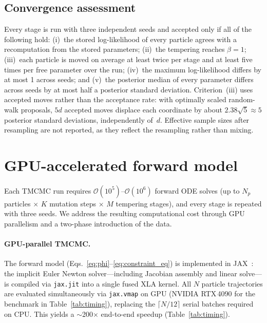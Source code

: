 \documentclass[pdflatex,sn-mathphys-num,lineno]{sn-jnl}
\begin{document}
\subsection{Convergence assessment}
\label{sec:convergence}

Every stage is run with three independent seeds and accepted only if all of the following hold:
(i)~the stored log-likelihood of every particle agrees with a recomputation from the stored parameters;
(ii)~the tempering reaches $\beta=1$;
(iii)~each particle is moved on average at least twice per stage and at least five times per free parameter over the run;
(iv)~the maximum log-likelihood differs by at most 1 across seeds; and
(v)~the posterior median of every parameter differs across seeds by at most half a posterior standard deviation.
Criterion~(iii) uses accepted moves rather than the acceptance rate: with optimally scaled random-walk proposals, $5d$ accepted moves displace each coordinate by about $2.38\sqrt5\approx5$ posterior standard deviations, independently of~$d$.
Effective sample sizes after resampling are not reported, as they reflect the resampling rather than mixing.


\section{GPU-accelerated forward model}
\label{sec:gpu}

Each TMCMC run requires $\mathcal{O}(10^5)$--$\mathcal{O}(10^6)$ forward ODE solves (up to $N_p$ particles $\times$ $K$ mutation steps $\times$ $M$ tempering stages), and every stage is repeated with three seeds.
We address the resulting computational cost through GPU parallelism and a two-phase introduction of the data.

\paragraph{GPU-parallel TMCMC.}
The forward model (Eqs.~\ref{eq:phi}--\ref{eq:constraint_eq}) is implemented in JAX~\cite{jax2018github}: the implicit Euler Newton solver---including Jacobian assembly and linear solve---is compiled via \texttt{jax.jit} into a single fused XLA kernel.
All $N$ particle trajectories are evaluated simultaneously via \texttt{jax.vmap} on GPU (NVIDIA RTX\,4090 for the benchmark in Table~\ref{tab:timing}), replacing the $\lceil N/12\rceil$ serial batches required on CPU.
This yields a $\sim$200$\times$ end-to-end speedup (Table~\ref{tab:timing}).
\end{document}
